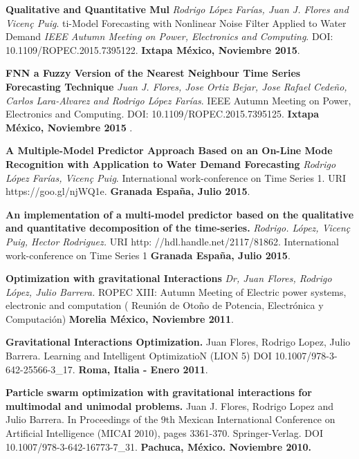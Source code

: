 \documentclass[10pt]{article}
\newenvironment{innerlist}[1][\enskip\textbullet]%
        {\begin{compactitem}[#1]}{\end{compactitem}}
\begin{document}
\begin{innerlist}
\item \textbf{Qualitative and Quantitative Mul} \textit{Rodrigo López Farías, Juan J. Flores and Vicen\c{c} Puig}.  ti-Model Forecasting with Nonlinear Noise Filter Applied to Water Demand \textit{IEEE Autumn Meeting on Power, Electronics and Computing}. DOI: 10.1109/ROPEC.2015.7395122.  \textbf{Ixtapa México, Noviembre 2015}.

\item \textbf{FNN a Fuzzy Version of the Nearest Neighbour Time Series Forecasting Technique } \textit{Juan J. Flores, Jose Ortiz Bejar, Jose Rafael Cedeño, Carlos Lara-Alvarez and Rodrigo López Farías}. {IEEE Autumn Meeting on Power, Electronics and Computing}. DOI: 10.1109/ROPEC.2015.7395125. \textbf{Ixtapa México, Noviembre 2015 }.

\item \textbf{A Multiple-Model Predictor Approach Based on an On-Line Mode Recognition with Application to Water Demand Forecasting} \textit{Rodrigo López Farías, Vicen\c{c} Puig}.  {International work-conference on Time Series 1. 
} URI https://goo.gl/njWQ1e. \textbf{Granada España, Julio 2015}.

\item \textbf{An implementation of a multi-model predictor based on the qualitative and quantitative decomposition of the time-series.} \textit{Rodrigo. López, Vicen\c{c} Puig, Hector Rodriguez.} URI http: //hdl.handle.net/2117/81862. {International work-conference on Time Series 1 
} \textbf{Granada España, Julio 2015}.

\item \textbf{Optimization with gravitational Interactions} \textit{Dr, Juan Flores, Rodrigo López, Julio Barrera.}   {ROPEC XIII: Autumn Meeting of Electric power systems, electronic and computation ( Reunión de Oto\~no de Potencia, Electrónica y Computación)} \textbf{ Morelia México, Noviembre 2011}.

\item \textbf{Gravitational Interactions Optimization.} Juan Flores, Rodrigo Lopez, Julio Barrera. {Learning and Intelligent OptimizatioN}  (LION 5) DOI 10.1007/978-3-642-25566-3\_17. \textbf{Roma, Italia - Enero 2011}. 

\item \textbf{Particle swarm optimization with gravitational interactions for multimodal and unimodal problems.} Juan J. Flores, Rodrigo Lopez and Julio Barrera.  In {Proceedings of the 9th Mexican International Conference on Artificial Intelligence (MICAI 2010)}, pages 3361-370. Springer-Verlag. DOI 10.1007/978-3-642-16773-7\_31. \textbf{Pachuca, México. Noviembre 2010.}

\end{innerlist}
\end{document}
